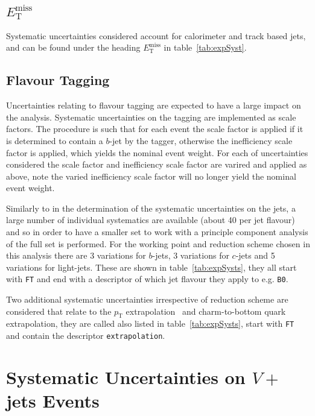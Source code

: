 \subsection{$E_{\mathrm{T}}^{\text{miss}}$}

Systematic uncertainties considered account for calorimeter and track based
jets, and can be found under the heading $E_{\mathrm{T}}^{\text{miss}}$ in
table~\ref{tab:expSyst}.

\subsection{Flavour Tagging}

Uncertainties relating to flavour tagging are expected to have a large impact on
the analysis. Systematic uncertainties on the tagging are implemented as scale
factors. The procedure is such that for each event the scale factor is applied
if it is determined to contain a $b$-jet by the tagger, otherwise the
inefficiency scale factor is applied, which yields the nominal event weight. For
each of uncertainties considered the scale factor and inefficiency scale factor
are varired and applied as above, note the varied inefficiency scale factor will
no longer yield the nominal event weight.

Similarly to in the determination of the systematic uncertainties on the jets, a
large number of individual systematics are available (about 40 per jet flavour)
and so in order to have a smaller set to work with a principle component
analysis of the full set is performed. For the working point and reduction
scheme chosen in this analysis there are 3 variations for $b$-jets, 3 variations
for $c$-jets and 5 variations for light-jets. These are shown in
table~\ref{tab:expSysts}, they all start with \texttt{FT} and end with a
descriptor of which jet flavour they apply to e.g. \texttt{B0}.

Two additional systematic uncertainties irrespective of reduction scheme are
considered that relate to the $p_{\mathrm{T}}$ extrapolation~\cite{BTaggingExtrap2015} and
charm-to-bottom quark extrapolation, they are called also listed in
table~\ref{tab:expSysts}, start with \texttt{FT} and contain the descriptor
\texttt{extrapolation}.

\section{Systematic Uncertainties on $V+$jets Events}
\label{sec:vjets}

